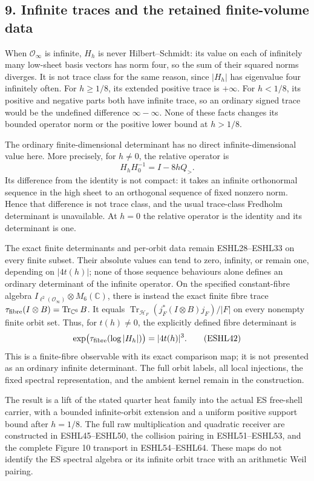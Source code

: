 \documentclass[
  10pt,
  a4paper,
]{article}
\begin{document}
\subsection{9. Infinite traces and the retained finite-volume
data}\label{infinite-traces-and-the-retained-finite-volume-data}

When \(\mathcal O_\infty\) is infinite, \(H_h\) is never
Hilbert--Schmidt: its value on each of infinitely many low-sheet basis
vectors has norm four, so the sum of their squared norms diverges. It is
not trace class for the same reason, since \(|H_h|\) has eigenvalue four
infinitely often. For \(h\ge1/8\), its extended positive trace is
\(+\infty\). For \(h<1/8\), its positive and negative parts both have
infinite trace, so an ordinary signed trace would be the undefined
difference \(\infty-\infty\). None of these facts changes its bounded
operator norm or the positive lower bound at \(h>1/8\).

The ordinary finite-dimensional determinant has no direct
infinite-dimensional value here. More precisely, for \(h\ne0\), the
relative operator is \[
H_hH_0^{-1}=I-8hQ_>.
\tag{ESHL41}
\] Its difference from the identity is not compact: it takes an infinite
orthonormal sequence in the high sheet to an orthogonal sequence of
fixed nonzero norm. Hence that difference is not trace class, and the
usual trace-class Fredholm determinant is unavailable. At \(h=0\) the
relative operator is the identity and its determinant is one.

The exact finite determinants and per-orbit data remain ESHL28--ESHL33
on every finite subset. Their absolute values can tend to zero,
infinity, or remain one, depending on \(|4t(h)|\); none of those
sequence behaviours alone defines an ordinary determinant of the
infinite operator. On the specified constant-fibre algebra
\(I_{\ell^2(\mathcal O_\infty)}\otimes M_6(\mathbb C)\), there is
instead the exact finite fibre trace
\(\tau_{\rm fibre}(I\otimes B)=\operatorname{Tr}_{\mathbb C^6}B\). It
equals \(\operatorname{Tr}_{\mathcal H_F}(j_F^*(I\otimes B)j_F)/|F|\) on
every nonempty finite orbit set. Thus, for \(t(h)\ne0\), the explicitly
defined fibre determinant is \[
\exp\bigl(\tau_{\rm fibre}(\log|H_h|)\bigr)=|4t(h)|^3.
\tag{ESHL42}
\] This is a finite-fibre observable with its exact comparison map; it
is not presented as an ordinary infinite determinant. The full orbit
labels, all local injections, the fixed spectral representation, and the
ambient kernel remain in the construction.

The result is a lift of the stated quarter heat family into the actual
ES free-shell carrier, with a bounded infinite-orbit extension and a
uniform positive support bound after \(h=1/8\). The full raw
multiplication and quadratic receiver are constructed in ESHL45--ESHL50,
the collision pairing in ESHL51--ESHL53, and the complete Figure 10
transport in ESHL54--ESHL64. These maps do not identify the ES spectral
algebra or its infinite orbit trace with an arithmetic Weil pairing.
\end{document}

